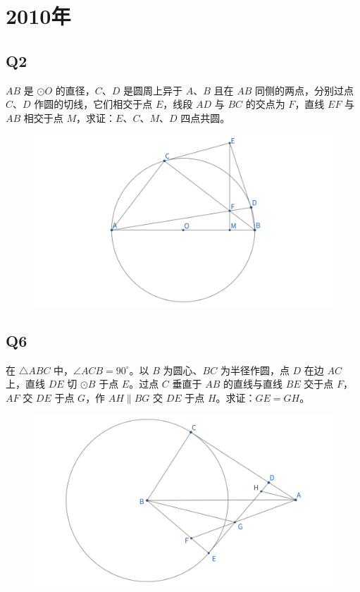 \documentclass{article}
\begin{document}
\newpage
\section{2010年}
\subsection{Q2}
$AB$ 是 $\odot O$ 的直径，$C$、$D$ 是圆周上异于 $A$、$B$ 且在 $AB$ 同侧的两点，分别过点 $C$、$D$ 作圆的切线，它们相交于点 $E$，线段 $AD$ 与 $BC$ 的交点为 $F$，直线 $EF$ 与 $AB$ 相交于点 $M$，求证：$E$、$C$、$M$、$D$ 四点共圆。
\begin{figure}[htbp]
    \centering
    \includegraphics[width=0.8\linewidth]{figures/西部赛10年Q2.png}
\end{figure}

\subsection{Q6}
在 $\triangle ABC$ 中，$\angle ACB = 90^\circ$。以 $B$ 为圆心、$BC$ 为半径作圆，点 $D$ 在边 $AC$ 上，直线 $DE$ 切 $\odot B$ 于点 $E$。过点 $C$ 垂直于 $AB$ 的直线与直线 $BE$ 交于点 $F$，$AF$ 交 $DE$ 于点 $G$，作 $AH \parallel BG$ 交 $DE$ 于点 $H$。求证：$GE = GH$。
\begin{figure}[htbp]
    \centering
    \includegraphics[width=0.8\linewidth]{figures/西部赛10年Q6.png}
\end{figure}
\end{document}
